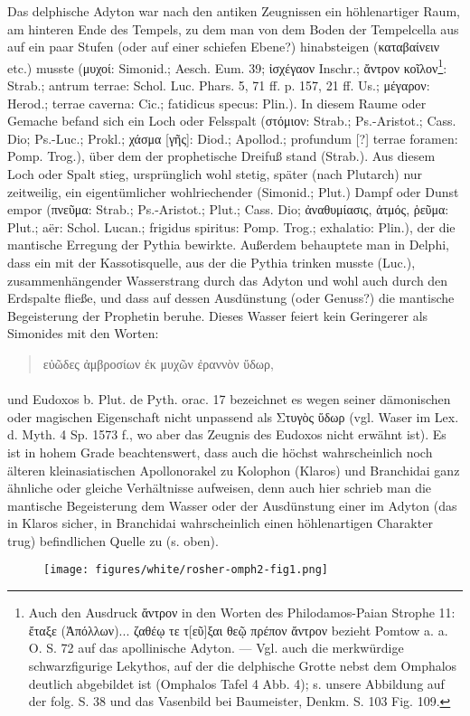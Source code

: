 \documentclass[a4paper, 11pt, oneside]{article}
\begin{document}
Das delphische Adyton war nach den antiken Zeugnissen ein höhlenartiger Raum, am hinteren Ende des Tempels, zu dem man von dem Boden der Tempelcella aus auf ein paar Stufen (oder auf einer schiefen Ebene?) hinabsteigen (καταβαίνειν etc.) musste (μυχοί: Simonid.; Aesch. Eum. 39; ἰσχέγαον Inschr.; ἄντρον κοῖλον\footnote{Auch den Ausdruck ἄντρον in den Worten des Philodamos-Paian Strophe 11: ἔταξε (Ἀπόλλων)... ζαθέῳ τε τ[εῦ]ξαι θεῷ πρέπον ἄντρον bezieht Pomtow a. a. O. S. 72 auf das apollinische Adyton. --- Vgl. auch die merkwürdige schwarzfigurige Lekythos, auf der die delphische Grotte nebst dem Omphalos deutlich abgebildet ist (Omphalos Tafel 4 Abb. 4); s. unsere Abbildung auf der folg. S. 38 und das Vasenbild bei Baumeister, Denkm. S. 103 Fig. 109.}: Strab.; antrum terrae: Schol. Luc. Phars. 5, 71 ff. p. 157, 21 ff. Us.; μέγαρον: Herod.; terrae caverna: Cic.; fatidicus specus: Plin.). In diesem Raume oder Gemache befand sich ein Loch oder Felsspalt (στόμιον: Strab.; Ps.-Aristot.; Cass. Dio; Ps.-Luc.; Prokl.; χάσμα [γῆς]: Diod.; Apollod.; profundum [?] terrae foramen: Pomp. Trog.), über dem der prophetische Dreifuß stand (Strab.). Aus diesem Loch oder Spalt stieg, ursprünglich wohl stetig, später (nach Plutarch) nur zeitweilig, ein eigentümlicher wohlriechender (Simonid.; Plut.) Dampf oder Dunst empor (πνεῦμα: Strab.; Ps.-Aristot.; Plut.; Cass. Dio; ἀναθυμίασις, ἀτμός, ῥεῦμα: Plut.; aër: Schol. Lucan.; frigidus spiritus: Pomp. Trog.; exhalatio: Plin.), der die mantische Erregung der Pythia bewirkte. Außerdem behauptete man in Delphi, dass ein mit der Kassotisquelle, aus der die Pythia trinken musste (Luc.), zusammenhängender Wasserstrang durch das Adyton und wohl auch durch den Erdspalte fließe, und dass auf dessen Ausdünstung (oder Genuss?) die mantische Begeisterung der Prophetin beruhe. Dieses Wasser feiert kein Geringerer als Simonides mit den Worten:
\begin{quotation}
εὐῶδες ἀμβροσίων ἐκ μυχῶν ἐραννὸν ὕδωρ,
\end{quotation}
\paragraph{}
und Eudoxos b. Plut. de Pyth. orac. 17 bezeichnet es wegen seiner dämonischen oder magischen Eigenschaft nicht unpassend als Στυγὸς ὕδωρ (vgl. Waser im Lex. d. Myth. 4 Sp. 1573 f., wo aber das Zeugnis des Eudoxos nicht erwähnt ist). Es ist in hohem Grade beachtenswert, dass auch die höchst wahrscheinlich noch älteren kleinasiatischen Apollonorakel zu Kolophon (Klaros) und Branchidai ganz ähnliche oder gleiche Verhältnisse aufweisen, denn auch hier schrieb man die mantische Begeisterung dem Wasser oder der Ausdünstung einer im Adyton (das in Klaros sicher, in Branchidai wahrscheinlich einen höhlenartigen Charakter trug) befindlichen Quelle zu (s. oben).
\begin{figure}[H]
\centering
\texttt{[image: figures/white/rosher-omph2-fig1.png]}
\caption{}
\end{figure}
\end{document}
